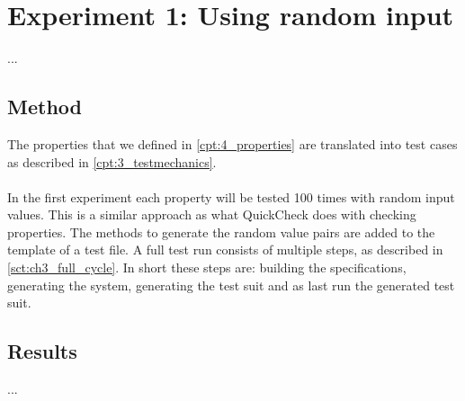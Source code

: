 \chapter{Experiment 1: Using random input}
\label{cpt:experiment1}
... %

\section{Method}
The properties that we defined in \autoref{cpt:4_properties} are translated into test cases as described in \autoref{cpt:3_testmechanics}.\\
\\
In the first experiment each property will be tested 100 times with random input values. This is a similar approach as what QuickCheck does with checking properties. The methods to generate the random value pairs are added to the template of a test file. A full test run consists of multiple steps, as described in \autoref{sct:ch3_full_cycle}. In short these steps are: building the specifications, generating the system, generating the test suit and as last run the generated test suit.

\section{Results}
... %

